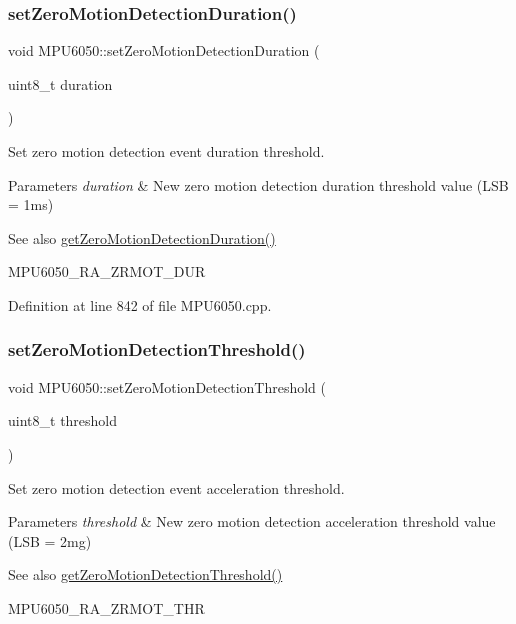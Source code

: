 \subsubsection{\texorpdfstring{setZeroMotionDetectionDuration()}{setZeroMotionDetectionDuration()}}
{\footnotesize\ttfamily void M\+P\+U6050\+::set\+Zero\+Motion\+Detection\+Duration (\begin{DoxyParamCaption}\item[{uint8\+\_\+t}]{duration }\end{DoxyParamCaption})}



Set zero motion detection event duration threshold. 


\begin{DoxyParams}{Parameters}
{\em duration} & New zero motion detection duration threshold value (L\+SB = 1ms) \\
\hline
\end{DoxyParams}
\begin{DoxySeeAlso}{See also}
\mbox{\hyperlink{classMPU6050_a04c0fcdcd0157b6dbf74d4901424801e}{get\+Zero\+Motion\+Detection\+Duration()}} 

M\+P\+U6050\+\_\+\+R\+A\+\_\+\+Z\+R\+M\+O\+T\+\_\+\+D\+UR 
\end{DoxySeeAlso}


Definition at line 842 of file M\+P\+U6050.\+cpp.

\mbox{\label{classMPU6050_a347a51fd25de20b9ead4659015ef793b}} 
\subsubsection{\texorpdfstring{setZeroMotionDetectionThreshold()}{setZeroMotionDetectionThreshold()}}
{\footnotesize\ttfamily void M\+P\+U6050\+::set\+Zero\+Motion\+Detection\+Threshold (\begin{DoxyParamCaption}\item[{uint8\+\_\+t}]{threshold }\end{DoxyParamCaption})}



Set zero motion detection event acceleration threshold. 


\begin{DoxyParams}{Parameters}
{\em threshold} & New zero motion detection acceleration threshold value (L\+SB = 2mg) \\
\hline
\end{DoxyParams}
\begin{DoxySeeAlso}{See also}
\mbox{\hyperlink{classMPU6050_ad941c1e844dc9230675c115734599ea3}{get\+Zero\+Motion\+Detection\+Threshold()}} 

M\+P\+U6050\+\_\+\+R\+A\+\_\+\+Z\+R\+M\+O\+T\+\_\+\+T\+HR 
\end{DoxySeeAlso}


